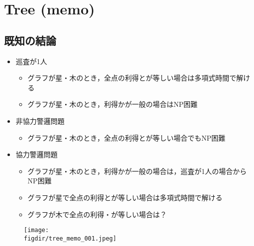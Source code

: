\section{Tree (memo) }


\subsection{ 既知の結論 }
\begin{itemize}
  \item 巡査が1人
  \begin{itemize}
    \item グラフが星・木のとき，全点の利得と{\idletime}が等しい場合は多項式時間で解ける
    \item グラフが星・木のとき，利得か{\idletime}が一般の場合はNP困難
  \end{itemize}

  \item 非協力警邏問題
  \begin{itemize}
    \item グラフが星・木のとき，全点の利得と{\idletime}が等しい場合でもNP困難
  \end{itemize}

  \item 協力警邏問題
  \begin{itemize}
    \item グラフが星・木のとき，利得か{\idletime}が一般の場合は，巡査が1人の場合からNP困難
    \item グラフが星で全点の利得と{\idletime}が等しい場合は多項式時間で解ける
    \item グラフが木で全点の利得・{\idletime}が等しい場合は？
  \end{itemize}
\end{itemize}




\begin{figure}[H]
  \texttt{[image: \\figdir/tree\_memo\_001.jpeg]}
\end{figure}


